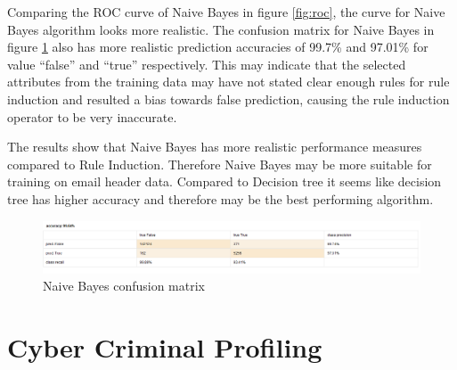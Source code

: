 \documentclass[hidelinks,english]{article}
\begin{document}
        Comparing the ROC curve of Naive Bayes in figure \ref{fig:roc}, the curve for Naive Bayes algorithm looks more realistic. The confusion matrix for Naive Bayes in figure \ref{fig:naive-bayes} also has more realistic prediction accuracies of 99.7\% and 97.01\% for value ``false'' and ``true'' respectively. This may indicate that the selected attributes from the training data may have not stated clear enough rules for rule induction and resulted a bias towards false prediction, causing the rule induction operator to be very inaccurate.
        
        The results show that Naive Bayes has more realistic performance measures compared to Rule Induction. Therefore Naive Bayes may be more suitable for training on email header data. Compared to Decision tree it seems like decision tree has higher accuracy and therefore may be the best performing algorithm.
        \begin{figure}[h]
        	\centering
            \includegraphics[width=\textwidth]{Naive-bayes-confusion-matrix.PNG}
            \caption{Naive Bayes confusion matrix}
            \label{fig:naive-bayes}
        \end{figure}               
            
	\section{Cyber Criminal Profiling}
\end{document}
